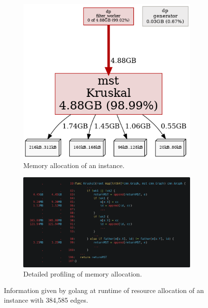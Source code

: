 \begin{figure}
    \centering
    \begin{subfigure}{0.3\textwidth}
        \includegraphics[width=\textwidth]{figures/too_much_mem.png}
        \caption{Memory allocation of an instance.}
    \end{subfigure}
    \hfill
    \begin{subfigure}{0.69\textwidth}
        \includegraphics[width=\textwidth]{figures/profile.png}
        \caption{Detailed profiling of memory allocation.}
    \end{subfigure}
    \caption{Information given by golang at runtime of resource allocation of an instance with 384,585 edges.}
    \label{fig:memory}
\end{figure}

